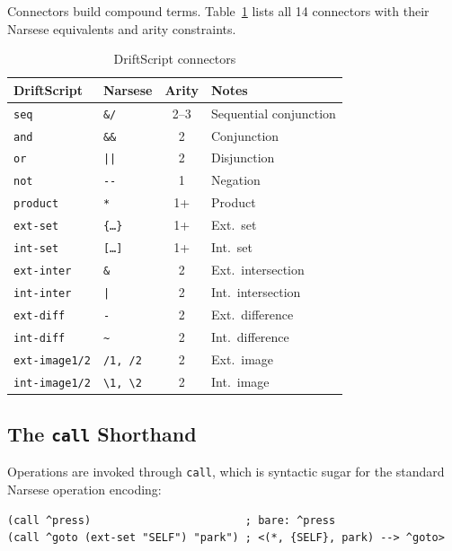 \documentclass[11pt,a4paper]{article}
\begin{document}
Connectors build compound terms. Table~\ref{tab:ds_connectors} lists all 14
connectors with their Narsese equivalents and arity constraints.

\begin{table}[h]
\centering
\caption{DriftScript connectors}
\label{tab:ds_connectors}
\begin{tabular}{llcl}
\toprule
\textbf{DriftScript} & \textbf{Narsese} & \textbf{Arity} & \textbf{Notes} \\
\midrule
\texttt{seq} & \texttt{\&/} & 2--3 & Sequential conjunction \\
\texttt{and} & \texttt{\&\&} & 2 & Conjunction \\
\texttt{or} & \texttt{||} & 2 & Disjunction \\
\texttt{not} & \texttt{-{}-} & 1 & Negation \\
\texttt{product} & \texttt{*} & 1+ & Product \\
\texttt{ext-set} & \texttt{\{\ldots\}} & 1+ & Ext.\ set \\
\texttt{int-set} & \texttt{[\ldots]} & 1+ & Int.\ set \\
\texttt{ext-inter} & \texttt{\&} & 2 & Ext.\ intersection \\
\texttt{int-inter} & \texttt{|} & 2 & Int.\ intersection \\
\texttt{ext-diff} & \texttt{-} & 2 & Ext.\ difference \\
\texttt{int-diff} & \texttt{\~{}} & 2 & Int.\ difference \\
\texttt{ext-image1/2} & \texttt{/1, /2} & 2 & Ext.\ image \\
\texttt{int-image1/2} & \texttt{\textbackslash 1, \textbackslash 2} & 2 & Int.\ image \\
\bottomrule
\end{tabular}
\end{table}

\subsection{The \texttt{call} Shorthand}

Operations are invoked through \texttt{call}, which is syntactic sugar for the
standard Narsese operation encoding:

\begin{lstlisting}[language=DriftScript]
(call ^press)                        ; bare: ^press
(call ^goto (ext-set "SELF") "park") ; <(*, {SELF}, park) --> ^goto>
\end{lstlisting}
\end{document}
